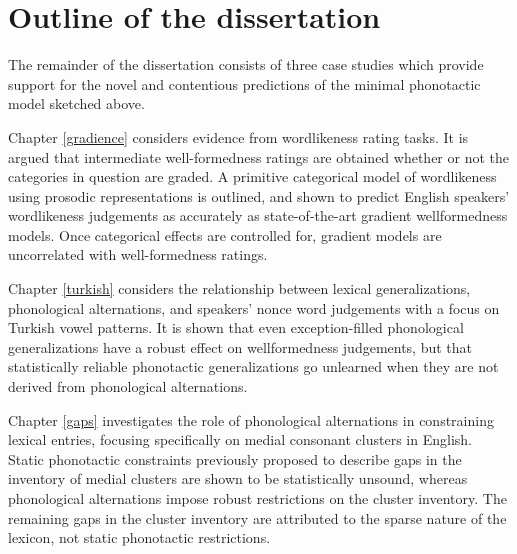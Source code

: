 \section{Outline of the dissertation}

The remainder of the dissertation consists of three case studies which provide support for the novel and contentious predictions of the minimal phonotactic model sketched above.

Chapter \ref{gradience} considers evidence from wordlikeness rating tasks. It is argued that intermediate well-formedness ratings are obtained whether or not the categories in question are graded. A primitive categorical model of wordlikeness using prosodic representations is outlined, and shown to predict English speakers' wordlikeness judgements as accurately as state-of-the-art gradient wellformedness models. Once categorical effects are controlled for, gradient models are uncorrelated with well-formedness ratings.

Chapter \ref{turkish} considers the relationship between lexical generalizations, phonological alternations, and speakers' nonce word judgements with a focus on Turkish vowel patterns. It is shown that even exception-filled phonological generalizations have a robust effect on wellformedness judgements, but that statistically reliable phonotactic generalizations go unlearned when they are not derived from phonological alternations.

Chapter \ref{gaps} investigates the role of phonological alternations in constraining lexical entries, focusing specifically on medial consonant clusters in English. Static phonotactic constraints previously proposed to describe gaps in the inventory of medial clusters are shown to be statistically unsound, whereas phonological alternations impose robust restrictions on the cluster inventory. The remaining gaps in the cluster inventory are attributed to the sparse nature of the lexicon, not static phonotactic restrictions.



